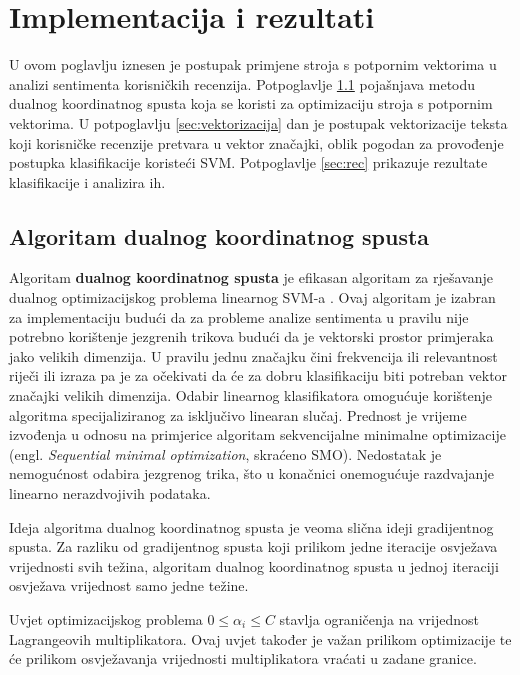 \documentclass[times, utf8, zavrsni, numeric]{fer}
\begin{document}
\chapter{Implementacija i rezultati} \label{eksperiment}
U ovom poglavlju iznesen je postupak primjene stroja s potpornim vektorima u analizi sentimenta korisničkih
recenzija.
Potpoglavlje \ref{cdesc} pojašnjava metodu dualnog koordinatnog spusta koja se koristi za optimizaciju stroja s
potpornim vektorima.
U potpoglavlju \ref{sec:vektorizacija} dan je postupak vektorizacije teksta koji korisničke recenzije 
pretvara u vektor značajki, oblik pogodan za provođenje postupka klasifikacije koristeći SVM.
Potpoglavlje \ref{sec:rec} prikazuje rezultate klasifikacije i analizira ih.

\section{Algoritam dualnog koordinatnog spusta} \label{cdesc}
Algoritam \textbf{dualnog koordinatnog spusta} je efikasan algoritam za rješavanje dualnog
optimizacijskog problema linearnog SVM-a \cite{Hsieh:2008:DCD:1390156.1390208}. 
Ovaj algoritam je izabran za implementaciju budući da za probleme analize sentimenta u pravilu
nije potrebno korištenje jezgrenih trikova budući da je vektorski prostor primjeraka
jako velikih dimenzija.
U pravilu jednu značajku čini frekvencija ili relevantnost riječi ili izraza pa je za očekivati da će
za dobru klasifikaciju biti potreban vektor značajki velikih dimenzija.
Odabir linearnog klasifikatora omogućuje korištenje algoritma specijaliziranog za isključivo linearan
slučaj.
Prednost je vrijeme izvođenja u odnosu na primjerice algoritam sekvencijalne minimalne optimizacije 
(engl. \textit{Sequential minimal optimization}, skraćeno SMO). 
Nedostatak je nemogućnost odabira jezgrenog trika, što u konačnici onemogućuje razdvajanje linearno
nerazdvojivih podataka.

\par Ideja algoritma dualnog koordinatnog spusta je veoma slična ideji gradijentnog spusta.
Za razliku od gradijentnog spusta koji prilikom jedne iteracije osvježava vrijednosti svih težina, 
algoritam dualnog koordinatnog spusta u jednoj iteraciji osvježava vrijednost samo jedne težine.
\par Uvjet optimizacijskog problema $0 \leq \alpha_i \leq C$ stavlja ograničenja na vrijednost 
Lagrangeovih multiplikatora. 
Ovaj uvjet također je važan prilikom optimizacije te će prilikom osvježavanja vrijednosti multiplikatora 
vraćati u zadane granice.
\end{document}
